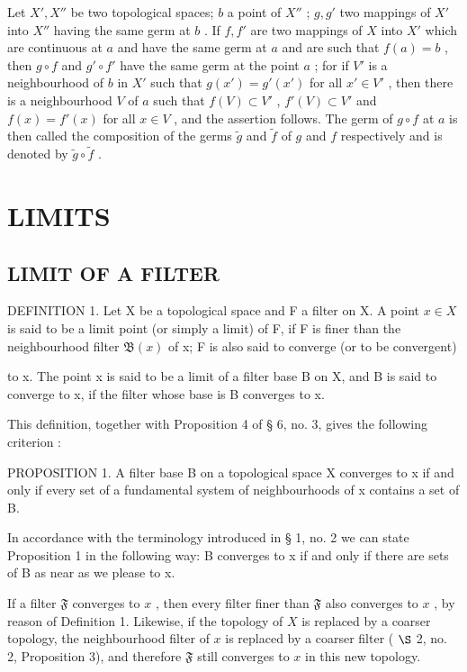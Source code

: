 Let \(X', X''\) be two topological spaces; \(b\) a point of \(X''\) ; \(g, g'\) two mappings of \(X'\) into \(X''\) having the same germ at \(b\) . If \(f, f'\) are two mappings of \(X\) into \(X'\) which are continuous at \(a\) and have the same germ at \(a\) and are such that \(f(a) = b\) , then \(g \circ f\) and \(g' \circ f'\) have the same germ at the point \(a\) ; for if \(V'\) is a neighbourhood of \(b\) in \(X'\) such that \(g(x') = g'(x')\) for all \(x' \in V'\) , then there is a neighbourhood \(V\) of \(a\) such that \(f(V) \subset V'\) , \(f'(V) \subset V'\) and \(f(x) = f'(x)\) for all \(x \in V\) , and the assertion follows. The germ of \(g \circ f\) at \(a\) is then called the composition of the germs \(\tilde{g}\) and \(\tilde{f}\) of \(g\) and \(f\) respectively and is denoted by \(\tilde{g} \circ \tilde{f}\) .

\section{LIMITS}

\subsection{LIMIT OF A FILTER}

DEFINITION 1. Let X be a topological space and F a filter on X. A point \(x \in X\) is said to be a limit point (or simply a limit) of F, if F is finer than the neighbourhood filter \(\mathfrak{B}(x)\) of x; F is also said to converge (or to be convergent)

to x. The point x is said to be a limit of a filter base B on X, and B is said to converge to x, if the filter whose base is B converges to x.

This definition, together with Proposition 4 of § 6, no. 3, gives the following criterion :

PROPOSITION 1. A filter base B on a topological space X converges to x if and only if every set of a fundamental system of neighbourhoods of x contains a set of B.

In accordance with the terminology introduced in § 1, no. 2 we can state Proposition 1 in the following way: B converges to x if and only if there are sets of B as near as we please to x.

If a filter \(\mathfrak{F}\) converges to \(x\) , then every filter finer than \(\mathfrak{F}\) also converges to \(x\) , by reason of Definition 1. Likewise, if the topology of \(X\) is replaced by a coarser topology, the neighbourhood filter of \(x\) is replaced by a coarser filter ( \(\S\) 2, no. 2, Proposition 3), and therefore \(\mathfrak{F}\) still converges to \(x\) in this new topology.

